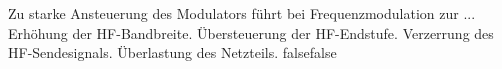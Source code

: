     {Zu starke Ansteuerung des Modulators führt bei Frequenzmodulation zur ...}
    {Erhöhung der HF-Bandbreite.}
    {Übersteuerung der HF-Endstufe.}
    {Verzerrung des HF-Sendesignals.}
    {Überlastung des Netzteils.}
    {false}{false}
